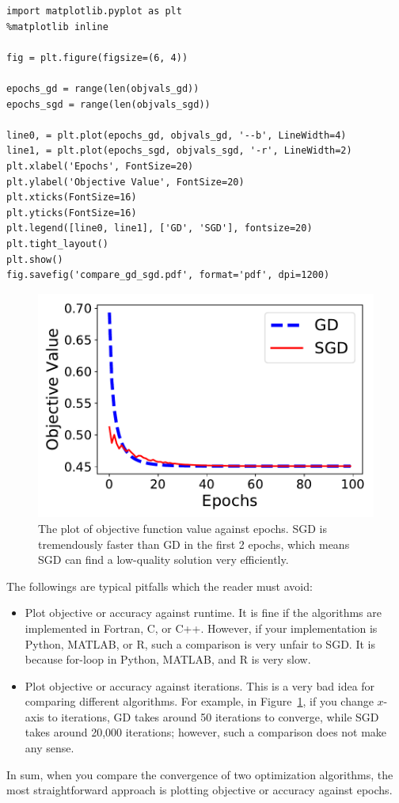 \documentclass[11pt]{article}
\numberwithin{equation}{section}
\begin{document}
\vspace{3mm}
\begin{lstlisting}
import matplotlib.pyplot as plt
%matplotlib inline

fig = plt.figure(figsize=(6, 4))

epochs_gd = range(len(objvals_gd))
epochs_sgd = range(len(objvals_sgd))

line0, = plt.plot(epochs_gd, objvals_gd, '--b', LineWidth=4)
line1, = plt.plot(epochs_sgd, objvals_sgd, '-r', LineWidth=2)
plt.xlabel('Epochs', FontSize=20)
plt.ylabel('Objective Value', FontSize=20)
plt.xticks(FontSize=16)
plt.yticks(FontSize=16)
plt.legend([line0, line1], ['GD', 'SGD'], fontsize=20)
plt.tight_layout()
plt.show()
fig.savefig('compare_gd_sgd.pdf', format='pdf', dpi=1200)
\end{lstlisting}
\vspace{3mm}



\begin{figure}[!h]
	\centering
	\includegraphics[width=0.6\linewidth]{figures/compare_gd_sgd.pdf}
	\caption{The plot of objective function value against epochs.
		SGD is tremendously faster than GD in the first 2 epochs,
		which means SGD can find a low-quality solution very efficiently.}
	\label{fig:compare_gd_sgd}
\end{figure}

\newpage

The followings are typical pitfalls which the reader must avoid:
\begin{itemize}
	\item 
	Plot objective or accuracy against runtime.
	It is fine if the algorithms are implemented in Fortran, C, or C++.
	However, if your implementation is Python, MATLAB, or R, such a comparison is very unfair to SGD.
	It is because for-loop in Python, MATLAB, and R is very slow.
	\item
	Plot objective or accuracy against iterations.
	This is a very bad idea for comparing different algorithms.
	For example, in Figure~\ref{fig:compare_gd_sgd}, if you change $x$-axis to iterations, GD takes around 50 iterations to converge, while SGD takes around 20,000 iterations;
	however, such a comparison does not make any sense.
\end{itemize}
In sum, when you compare the convergence of two optimization algorithms, the most straightforward approach is plotting objective or accuracy against epochs.
\end{document}
